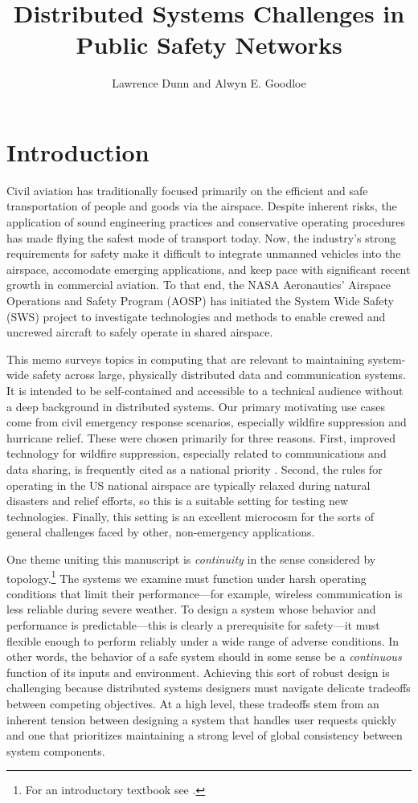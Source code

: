 \documentclass[]             %
{NASA}                       %
\title{Distributed Systems Challenges in Public Safety Networks}
\author{Lawrence Dunn and Alwyn E. Goodloe}
\theoremstyle{definition}
\begin{document}
\newpage
\setcounter{tocdepth}{2}
\tableofcontents
\newpage

\section{Introduction}
\label{sec:introduction}
Civil aviation has traditionally focused primarily on the efficient
and safe transportation of people and goods via the airspace. Despite
inherent risks, the application of sound engineering practices and
conservative operating procedures has made flying the safest mode of
transport today. Now, the industry's strong requirements for safety
make it difficult to integrate unmanned vehicles into the airspace,
accomodate emerging applications, and keep pace with significant
recent growth in commercial aviation. To that end, the NASA
Aeronautics' Airspace Operations and Safety Program (AOSP) has
initiated the System Wide Safety (SWS) project to investigate
technologies and methods to enable crewed and uncrewed aircraft to
safely operate in shared airspace.

This memo surveys topics in computing that are relevant to maintaining
system-wide safety across large, physically distributed data and
communication systems. It is intended to be self-contained and
accessible to a technical audience without a deep background in
distributed systems. Our primary motivating use cases come from civil
emergency response scenarios, especially wildfire suppression and
hurricane relief. These were chosen primarily for three
reasons. First, improved technology for wildfire suppression,
especially related to communications and data sharing, is frequently
cited as a national priority \cite{pcast2023}.  Second, the rules for
operating in the US national airspace are typically relaxed during
natural disasters and relief efforts, so this is a suitable setting
for testing new technologies. Finally, this setting is an excellent
microcosm for the sorts of general challenges faced by other,
non-emergency applications.

One theme uniting this manuscript is \emph{continuity} in the sense
considered by topology.\footnote{For an introductory textbook see
  \cite{mendelson2012introduction}.}  The systems we examine must
function under harsh operating conditions that limit their
performance---for example, wireless communication is less reliable
during severe weather. To design a system whose behavior and
performance is predictable---this is clearly a prerequisite for
safety---it must flexible enough to perform reliably under a wide
range of adverse conditions. In other words, the behavior of a safe
system should in some sense be a \emph{continuous} function of its
inputs and environment. Achieving this sort of robust design is
challenging because distributed systems designers must navigate
delicate tradeoffs between competing objectives. At a high level,
these tradeoffs stem from an inherent tension between designing a
system that handles user requests quickly and one that prioritizes
maintaining a strong level of global consistency between system
components.
\end{document}
